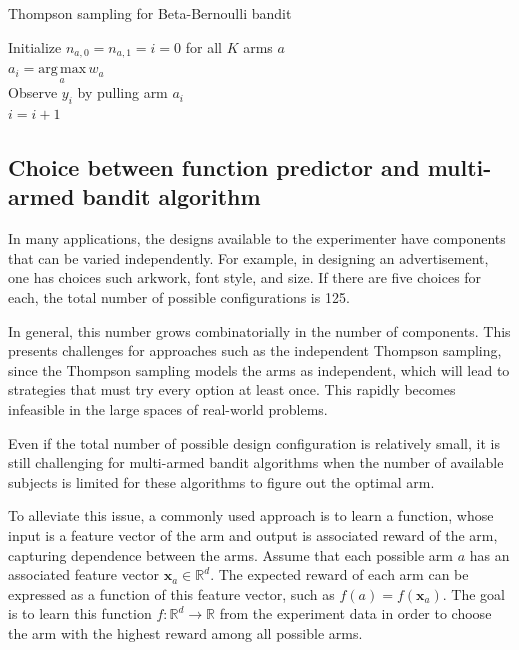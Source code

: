 \documentclass{article}
\begin{document}
\begin{algorithm}[h] \label{algo:thompson-sampling}

  \caption{Thompson sampling for Beta-Bernoulli bandit}
  Initialize $n_{a,0}=n_{a,1}=i=0$ for all $K$ arms $a$ \\
   {
    $a_i = \underset{a}{\mathrm{arg\, max}}\, w_a$ \\
    Observe $y_i$ by pulling arm $a_i$ \\
    $i = i + 1$ \\
 }
\end{algorithm}

\subsection{Choice between function predictor and multi-armed bandit algorithm}
In many applications, the designs available to the experimenter have
components that can be varied independently. For example, in designing
an advertisement, one has choices such arkwork, font style, and
size. If there are five choices for each, the total number of possible
configurations is 125.

In general, this number grows combinatorially in the number of
components. This presents challenges for approaches such as the independent
Thompson sampling, since the Thompson sampling models the arms as independent, which will lead
to strategies that must try every option at least once. This rapidly
becomes infeasible in the large spaces of real-world problems.

Even if the total number of possible design configuration is
relatively small, it is still challenging for multi-armed bandit
algorithms when the number of available subjects is limited for these
algorithms to figure out the optimal arm.

To alleviate this issue, a commonly used approach is to learn a
function, whose input is a feature vector of the arm and output is
associated reward of the arm, capturing dependence between the arms. Assume that each possible arm $a$ has an
associated feature vector $\mathbf{x}_a\in \mathbb{R}^d$. The expected
reward of each arm can be expressed as a function of this feature
vector, such as $f(a) = f(\mathbf{x}_a)$. The goal is to learn this
function $f:\mathbb{R}^d \rightarrow \mathbb{R}$ from the experiment
data in order to choose the arm with the highest reward among all
possible arms.
\end{document}
